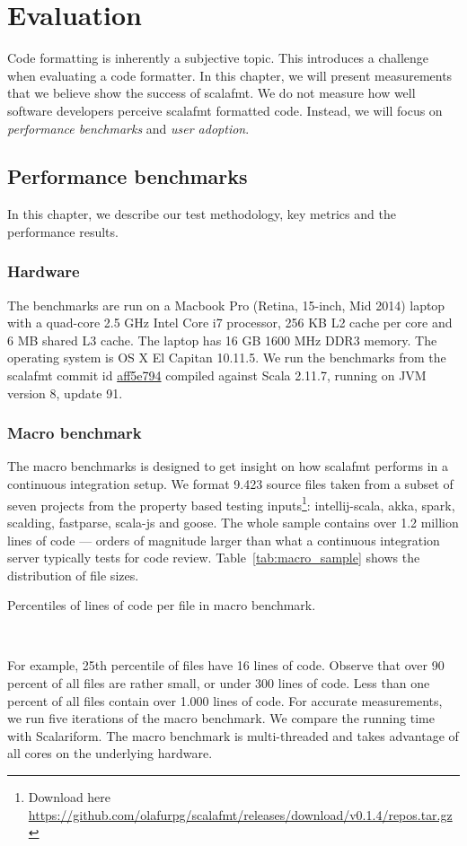 \section{Evaluation}
Code formatting is inherently a subjective topic.
This introduces a challenge when evaluating a code formatter.
In this chapter, we will present measurements that we believe show the success of scalafmt.
We do not measure how well software developers perceive scalafmt formatted code.
Instead, we will focus on \emph{performance benchmarks} and \emph{user adoption}.

\subsection{Performance benchmarks}
In this chapter, we describe our test methodology, key metrics and the performance results.

\subsubsection{Hardware}
The benchmarks are run on a Macbook Pro (Retina, 15-inch, Mid 2014) laptop with a quad-core 2.5 GHz Intel Core i7 processor, 256 KB L2 cache per core and 6 MB shared L3 cache.
The laptop has 16 GB 1600 MHz DDR3 memory.
The operating system is OS X El Capitan 10.11.5.
We run the benchmarks from the scalafmt commit id \href{https://github.com/olafurpg/scalafmt/tree/aff5e794dae4787b08243f8abb87a3ca4d907e40}{aff5e794} compiled against Scala 2.11.7, running on JVM version 8, update 91.

\subsubsection{Macro benchmark}
The macro benchmarks is designed to get insight on how scalafmt performs in a continuous integration setup.
We format 9.423 source files taken from a subset of seven projects from the property based testing inputs\footnote{
  Download here \url{https://github.com/olafurpg/scalafmt/releases/download/v0.1.4/repos.tar.gz}
}: intellij-scala, akka, spark, scalding, fastparse, scala-js and goose.
The whole sample contains over 1.2 million lines of code --- orders of magnitude larger than what a continuous integration server typically tests for code review.
Table~\ref{tab:macro_sample} shows the distribution of file sizes.
\begin{table}
  \centering
  \caption{Percentiles of lines of code per file in macro benchmark.}~\label{tab:macro_sample}
  
\end{table}
For example, 25th percentile of files have 16 lines of code.
Observe that over 90 percent of all files are rather small, or under 300 lines of code.
Less than one percent of all files contain over 1.000 lines of code.
For accurate measurements, we run five iterations of the macro benchmark.
We compare the running time with Scalariform.
The macro benchmark is multi-threaded and takes advantage of all cores on the underlying hardware.

